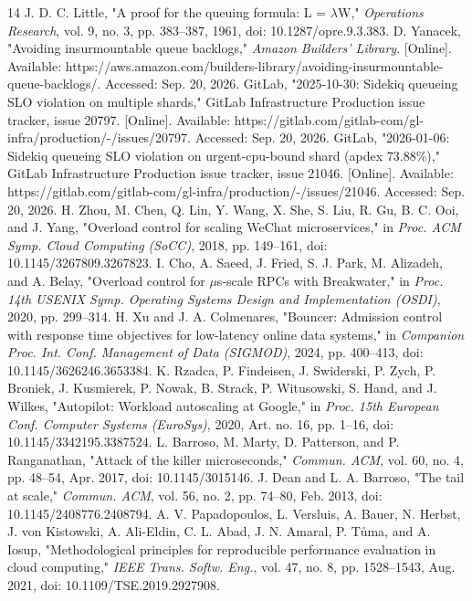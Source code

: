 \documentclass{ieeeaccess}
\begin{document}
\begin{thebibliography}{14}
 J. D. C. Little, "A proof for the queuing formula: L = $\lambda$W," \textit{Operations Research}, vol. 9, no. 3, pp. 383--387, 1961, doi: 10.1287/opre.9.3.383.
 D. Yanacek, "Avoiding insurmountable queue backlogs," \textit{Amazon Builders' Library}. [Online]. Available: https://aws.amazon.com/builders-library/avoiding-insurmountable-queue-backlogs/. Accessed: Sep. 20, 2026.
 GitLab, "2025-10-30: Sidekiq queueing SLO violation on multiple shards," GitLab Infrastructure Production issue tracker, issue 20797. [Online]. Available: https://gitlab.com/gitlab-com/gl-infra/production/-/issues/20797. Accessed: Sep. 20, 2026.
 GitLab, "2026-01-06: Sidekiq queueing SLO violation on urgent-cpu-bound shard (apdex 73.88\%)," GitLab Infrastructure Production issue tracker, issue 21046. [Online]. Available: https://gitlab.com/gitlab-com/gl-infra/production/-/issues/21046. Accessed: Sep. 20, 2026.
 H. Zhou, M. Chen, Q. Lin, Y. Wang, X. She, S. Liu, R. Gu, B. C. Ooi, and J. Yang, "Overload control for scaling WeChat microservices," in \textit{Proc. ACM Symp. Cloud Computing (SoCC)}, 2018, pp. 149--161, doi: 10.1145/3267809.3267823.
 I. Cho, A. Saeed, J. Fried, S. J. Park, M. Alizadeh, and A. Belay, "Overload control for $\mu$s-scale RPCs with Breakwater," in \textit{Proc. 14th USENIX Symp. Operating Systems Design and Implementation (OSDI)}, 2020, pp. 299--314.
 H. Xu and J. A. Colmenares, "Bouncer: Admission control with response time objectives for low-latency online data systems," in \textit{Companion Proc. Int. Conf. Management of Data (SIGMOD)}, 2024, pp. 400--413, doi: 10.1145/3626246.3653384.
 K. Rzadca, P. Findeisen, J. Swiderski, P. Zych, P. Broniek, J. Kusmierek, P. Nowak, B. Strack, P. Witusowski, S. Hand, and J. Wilkes, "Autopilot: Workload autoscaling at Google," in \textit{Proc. 15th European Conf. Computer Systems (EuroSys)}, 2020, Art. no. 16, pp. 1--16, doi: 10.1145/3342195.3387524.
 L. Barroso, M. Marty, D. Patterson, and P. Ranganathan, "Attack of the killer microseconds," \textit{Commun. ACM}, vol. 60, no. 4, pp. 48--54, Apr. 2017, doi: 10.1145/3015146.
 J. Dean and L. A. Barroso, "The tail at scale," \textit{Commun. ACM}, vol. 56, no. 2, pp. 74--80, Feb. 2013, doi: 10.1145/2408776.2408794.
 A. V. Papadopoulos, L. Versluis, A. Bauer, N. Herbst, J. von Kistowski, A. Ali-Eldin, C. L. Abad, J. N. Amaral, P. T\r{u}ma, and A. Iosup, "Methodological principles for reproducible performance evaluation in cloud computing," \textit{IEEE Trans. Softw. Eng.}, vol. 47, no. 8, pp. 1528--1543, Aug. 2021, doi: 10.1109/TSE.2019.2927908.

\end{thebibliography}
\end{document}
